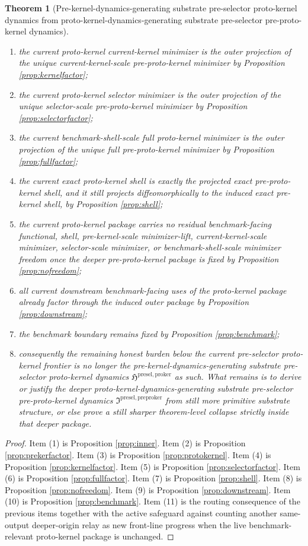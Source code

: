 \documentclass[11pt]{article}
\newcommand{\ProtoKernelPackage}{\mathfrak H^{\mathrm{presel,proker}}}
\newcommand{\PreProtoKernelPackage}{\mathfrak I^{\mathrm{presel,preproker}}}
\newtheorem{theorem}{Theorem}
\begin{document}
\begin{theorem}[Pre-kernel-dynamics-generating substrate pre-selector proto-kernel dynamics from proto-kernel-dynamics-generating substrate pre-selector pre-proto-kernel dynamics]
\begin{enumerate}
    \item the current proto-kernel current-kernel minimizer is the outer projection of the unique current-kernel-scale pre-proto-kernel minimizer by Proposition \ref{prop:kernelfactor};
    \item the current proto-kernel selector minimizer is the outer projection of the unique selector-scale pre-proto-kernel minimizer by Proposition \ref{prop:selectorfactor};
    \item the current benchmark-shell-scale full proto-kernel minimizer is the outer projection of the unique full pre-proto-kernel minimizer by Proposition \ref{prop:fullfactor};
    \item the current exact proto-kernel shell is exactly the projected exact pre-proto-kernel shell, and it still projects diffeomorphically to the induced exact pre-kernel shell, by Proposition \ref{prop:shell};
    \item the current proto-kernel package carries no residual benchmark-facing functional, shell, pre-kernel-scale minimizer-lift, current-kernel-scale minimizer, selector-scale minimizer, or benchmark-shell-scale minimizer freedom once the deeper pre-proto-kernel package is fixed by Proposition \ref{prop:nofreedom};
    \item all current downstream benchmark-facing uses of the proto-kernel package already factor through the induced outer package by Proposition \ref{prop:downstream};
    \item the benchmark boundary remains fixed by Proposition \ref{prop:benchmark};
    \item consequently the remaining honest burden below the current pre-selector proto-kernel frontier is no longer the pre-kernel-dynamics-generating substrate pre-selector proto-kernel dynamics \(\ProtoKernelPackage\) as such. What remains is to derive or justify the deeper proto-kernel-dynamics-generating substrate pre-selector pre-proto-kernel dynamics \(\PreProtoKernelPackage\) from still more primitive substrate structure, or else prove a still sharper theorem-level collapse strictly inside that deeper package.
\end{enumerate}
\end{theorem}

\begin{proof}
Item (1) is Proposition \ref{prop:inner}. Item (2) is Proposition \ref{prop:prekerfactor}. Item (3) is Proposition \ref{prop:protokernel}. Item (4) is Proposition \ref{prop:kernelfactor}. Item (5) is Proposition \ref{prop:selectorfactor}. Item (6) is Proposition \ref{prop:fullfactor}. Item (7) is Proposition \ref{prop:shell}. Item (8) is Proposition \ref{prop:nofreedom}. Item (9) is Proposition \ref{prop:downstream}. Item (10) is Proposition \ref{prop:benchmark}. Item (11) is the routing consequence of the previous items together with the active safeguard against counting another same-output deeper-origin relay as new front-line progress when the live benchmark-relevant proto-kernel package is unchanged.
\end{proof}
\end{document}
